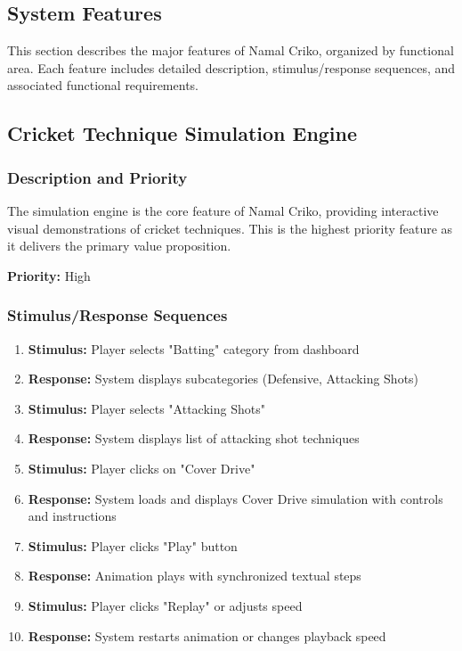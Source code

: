 \documentclass[12pt,a4paper]{article}
\begin{document}
\begin{enumerate}
\section{System Features}

This section describes the major features of Namal Criko, organized by functional area. Each feature includes detailed description, stimulus/response sequences, and associated functional requirements.

\subsection{Cricket Technique Simulation Engine}

\subsubsection{Description and Priority}
The simulation engine is the core feature of Namal Criko, providing interactive visual demonstrations of cricket techniques. This is the highest priority feature as it delivers the primary value proposition.

\textbf{Priority:} High

\subsubsection{Stimulus/Response Sequences}
\begin{enumerate}
    \item \textbf{Stimulus:} Player selects "Batting" category from dashboard
    \item \textbf{Response:} System displays subcategories (Defensive, Attacking Shots)
    \item \textbf{Stimulus:} Player selects "Attacking Shots"
    \item \textbf{Response:} System displays list of attacking shot techniques
    \item \textbf{Stimulus:} Player clicks on "Cover Drive"
    \item \textbf{Response:} System loads and displays Cover Drive simulation with controls and instructions
    \item \textbf{Stimulus:} Player clicks "Play" button
    \item \textbf{Response:} Animation plays with synchronized textual steps
    \item \textbf{Stimulus:} Player clicks "Replay" or adjusts speed
    \item \textbf{Response:} System restarts animation or changes playback speed
\end{enumerate}


\end{enumerate}
\end{document}
